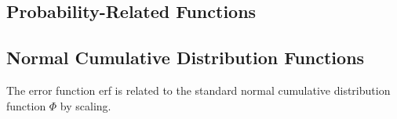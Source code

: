 \begin{description}
\begin{description}
\begin{description}
\begin{description}
\begin{description}
\begin{description}
\begin{description}
\begin{description}
\begin{description}
\begin{description}
\begin{description}
\begin{description}
\begin{description}
\begin{description}
\begin{description}
\begin{description}
\begin{description}
\begin{description}
\begin{description}
\begin{description}
\begin{description}   %



\section{Probability-Related Functions}

\subsection{Normal Cumulative Distribution Functions}

The error function erf is related to the standard normal cumulative distribution function $\Phi$ by scaling.


\end{description}
\end{description}
\end{description}
\end{description}
\end{description}
\end{description}
\end{description}
\end{description}
\end{description}
\end{description}
\end{description}
\end{description}
\end{description}
\end{description}
\end{description}
\end{description}
\end{description}
\end{description}
\end{description}
\end{description}
\end{description}
